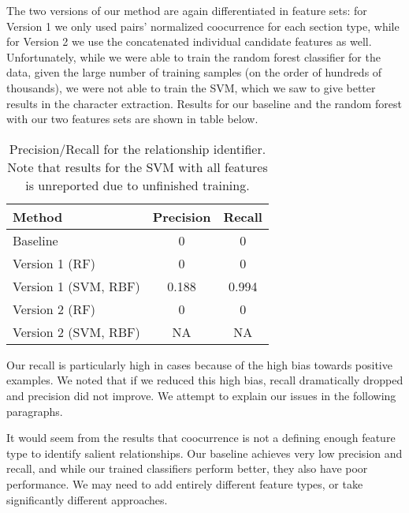 \documentclass[12pt]{article}
\begin{document}
        The two versions of our method are again differentiated in feature sets: for Version 1 we only used
        pairs' normalized coocurrence for each section type, while for Version 2 we use the concatenated
        individual candidate features as well. Unfortunately, while we were able to train the random
        forest classifier for the data, given the large number of training samples (on the order of hundreds
        of thousands), we were not able to train the SVM, which we saw to give better results
        in the character extraction. Results for our baseline and the random forest with our two
        features sets are shown in table below.

        \begin{table}[H]
        \begin{center}
            \begin{tabular}{l|c|c}
                \textbf{Method} & \textbf{Precision} & \textbf{Recall} \\ 
                \hline
                Baseline & 0 & 0 \\
                \hline
                Version 1 (RF) & 0 & 0 \\
                \hline
                Version 1 (SVM, RBF) & 0.188 & 0.994 \\
                \hline
                Version 2 (RF) & 0 & 0 \\ 
                \hline
                Version 2 (SVM, RBF) & NA & NA 
                
            \end{tabular}
            \caption{Precision/Recall for the relationship identifier. Note that results for the SVM with all features is unreported due to unfinished training.}
        \end{center}
        \end{table}

        Our recall is particularly high in cases because of the high bias towards positive examples.
        We noted that if we reduced this high bias, recall dramatically dropped and precision did not improve. 
        We attempt to explain our issues in the following paragraphs.

        It would seem from the results that coocurrence is not a defining enough feature type to
        identify salient relationships. Our baseline achieves very low precision and recall, and while
        our trained classifiers perform better, they also have poor performance. We may need to add entirely different feature types, or take significantly different
        approaches. \\
\end{document}
